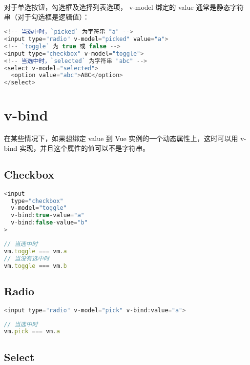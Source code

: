 对于单选按钮，勾选框及选择列表选项， v-model 绑定的 value 通常是静态字符串（对于勾选框是逻辑值）：


\begin{lstlisting}[language=JavaScript]
<!-- 当选中时，`picked` 为字符串 "a" -->
<input type="radio" v-model="picked" value="a">
<!-- `toggle` 为 true 或 false -->
<input type="checkbox" v-model="toggle">
<!-- 当选中时，`selected` 为字符串 "abc" -->
<select v-model="selected">
  <option value="abc">ABC</option>
</select>
\end{lstlisting}

\section{v-bind}


在某些情况下，如果想绑定 value 到 Vue 实例的一个动态属性上，这时可以用 v-bind 实现，并且这个属性的值可以不是字符串。


\subsection{Checkbox}






\begin{lstlisting}[language=JavaScript]
<input
  type="checkbox"
  v-model="toggle"
  v-bind:true-value="a"
  v-bind:false-value="b"
>
\end{lstlisting}



\begin{lstlisting}[language=JavaScript]
// 当选中时
vm.toggle === vm.a
// 当没有选中时
vm.toggle === vm.b
\end{lstlisting}

\subsection{Radio}


\begin{lstlisting}[language=JavaScript]
<input type="radio" v-model="pick" v-bind:value="a">
\end{lstlisting}




\begin{lstlisting}[language=JavaScript]
// 当选中时
vm.pick === vm.a
\end{lstlisting}

\subsection{Select}



